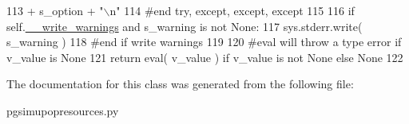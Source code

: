 \begin{DoxyCode}
113                     + s\_option + \textcolor{stringliteral}{"\(\backslash\)n"} 
114         \textcolor{comment}{#end try, except, except, except}
115 
116         \textcolor{keywordflow}{if} self.\hyperlink{classnegui_1_1pgsimupopresources_1_1PGSimuPopResources_ae4805ab6ba55817bc2e40fd622d76483}{\_\_write\_warnings} \textcolor{keywordflow}{and} s\_warning \textcolor{keywordflow}{is} \textcolor{keywordflow}{not} \textcolor{keywordtype}{None}:
117             sys.stderr.write( s\_warning )
118         \textcolor{comment}{#end if write warnings }
119 
120         \textcolor{comment}{#eval will throw a type error if v\_value is None}
121         \textcolor{keywordflow}{return} eval( v\_value ) \textcolor{keywordflow}{if} v\_value \textcolor{keywordflow}{is} \textcolor{keywordflow}{not} \textcolor{keywordtype}{None} \textcolor{keywordflow}{else} \textcolor{keywordtype}{None}
122 
\end{DoxyCode}


The documentation for this class was generated from the following file\+:\begin{DoxyCompactItemize}
\item 
pgsimupopresources.\+py\end{DoxyCompactItemize}

